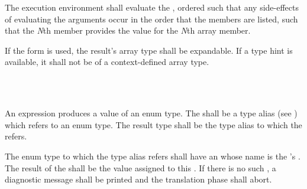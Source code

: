 \specsubsubitem
The execution environment shall evaluate the ,
ordered such that any side-effects of evaluating the arguments occur in the
order that the members are listed, such that the \textit{N}th member provides
the value for the \textit{N}th array member.

\specsubsubitem
If the  form is used, the result's array type shall be expandable.
If a type hint is available, it shall not be of a context-defined array type.


\begin{grammar}
 \exactly \\
	 \terminal{::}  \\
\end{grammar}

\specsubsubitem
An  expression produces a value of an enum type. The
 shall be a type alias (see )
which refers to an enum type. The result type shall be the type alias to which
the  refers.

\specsubsubitem
The enum type to which the type alias refers shall have an
 whose name is the 's
. The result of the 
shall be the value assigned to this . If there is no
such , a diagnostic message shall be printed and the
translation phase shall abort. 


\begin{grammar}
 \\
	 \terminal{\{}  \optional{\terminal{,}} \terminal{\}} \\
	 \terminal{\{}  \optional{\terminal{,}} \terminal{\}} \\

 \\
	 \\
	 \terminal{,}  \\
	 \\

 \\
	 \\
	 \terminal{,}  \\

 \\
	 \terminal{=}  \\
	 \terminal{:}  \terminal{=}  \\
	 \\
\end{grammar}

